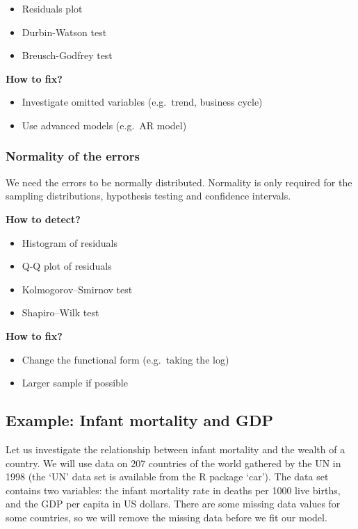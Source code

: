 \documentclass[
]{article}
\begin{document}
\begin{itemize}
\item
  Residuals plot
\item
  Durbin-Watson test
\item
  Breusch-Godfrey test
\end{itemize}

\textbf{How to fix?}

\begin{itemize}
\item
  Investigate omitted variables (e.g.~trend, business cycle)
\item
  Use advanced models (e.g.~AR model)
\end{itemize}

\hypertarget{normality-of-the-errors}{%
\subsubsection{Normality of the errors}\label{normality-of-the-errors}}

We need the errors to be normally distributed. Normality is only
required for the sampling distributions, hypothesis testing and
confidence intervals.

\textbf{How to detect?}

\begin{itemize}
\item
  Histogram of residuals
\item
  Q-Q plot of residuals
\item
  Kolmogorov--Smirnov test
\item
  Shapiro--Wilk test
\end{itemize}

\textbf{How to fix?}

\begin{itemize}
\item
  Change the functional form (e.g.~taking the log)
\item
  Larger sample if possible
\end{itemize}

\hypertarget{example-infant-mortality-and-gdp}{%
\subsection{Example: Infant mortality and
GDP}\label{example-infant-mortality-and-gdp}}

Let us investigate the relationship between infant mortality and the
wealth of a country. We will use data on 207 countries of the world
gathered by the UN in 1998 (the `UN' data set is available from the R
package `car'). The data set contains two variables: the infant
mortality rate in deaths per 1000 live births, and the GDP per capita in
US dollars. There are some missing data values for some countries, so we
will remove the missing data before we fit our model.
\end{document}
